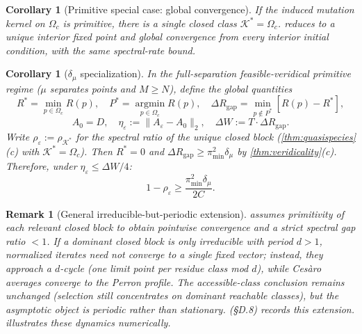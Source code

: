 \documentclass[12pt]{article}
\newtheorem{corollary}[theorem]{Corollary}
\newtheorem{remark}[theorem]{Remark}
\newcommand{\dmu}{\delta_\mu}
\newcommand{\pimin}{\pi_{\min}}
\newcommand{\argmin}{\operatorname*{argmin}}
\begin{document}
\begin{corollary}[Primitive special case: global convergence]\label{cor:primitive}
If the induced mutation kernel on $\Omega_c$ is primitive, there is a single closed class $\mathcal{K}^* = \Omega_c$.  reduces to a unique interior fixed point and global convergence from every interior initial condition, with the same spectral-rate bound.
\end{corollary}

\begin{corollary}[$\dmu$ specialization]\label{cor:delta-spec}
In the full-separation feasible-veridical primitive regime ($\mu$ separates points and $M \ge N$), define the global quantities
\[
R^* = \min_{p \in \Omega_c} R(p), \quad P^* = \argmin_{p \in \Omega_c} R(p), \quad
\Delta R_{\mathrm{gap}} = \min_{p \notin P^*}[R(p) - R^*],
\]
\[
A_0 = D, \quad \eta_\varepsilon := \|A_\varepsilon - A_0\|_2, \quad \Delta W := T \cdot \Delta R_{\mathrm{gap}}.
\]
Write $\rho_\varepsilon := \rho_{\mathcal{K}^*}$ for the spectral ratio of the unique closed block (\cref{thm:quasispecies}(c) with $\mathcal{K}^* = \Omega_c$). Then $R^* = 0$ and $\Delta R_{\mathrm{gap}} \ge \pimin^2 \dmu$ by \cref{thm:veridicality}(c). Therefore, under $\eta_\varepsilon \le \Delta W/4$:
\begin{equation}\label{eq:delta-bound}
1 - \rho_\varepsilon \ge \frac{\pimin^2 \dmu}{2C}.
\end{equation}
\end{corollary}

\begin{remark}[General irreducible-but-periodic extension]\label{rem:periodic}
 assumes primitivity of each relevant closed block to obtain pointwise convergence and a strict spectral gap ratio $< 1$. If a dominant closed block is only irreducible with period $d > 1$, normalized iterates need not converge to a single fixed vector; instead, they approach a $d$-cycle (one limit point per residue class mod $d$), while Ces\`aro averages converge to the Perron profile. The accessible-class conclusion remains unchanged (selection still concentrates on dominant reachable classes), but the asymptotic object is periodic rather than stationary.  (\S D.8) records this extension.  illustrates these dynamics numerically.
\end{remark}
\end{document}
